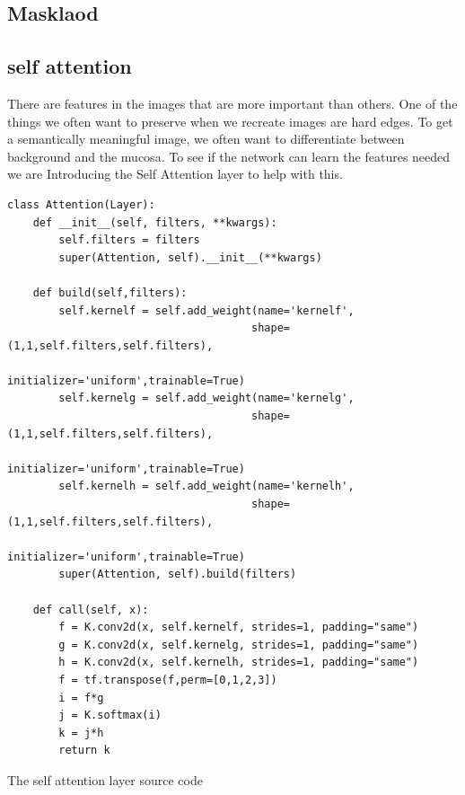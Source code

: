 \subsection{Masklaod}
\subsection{self attention}
There are features in the images that are more important than others. One of the things we often want to preserve when we recreate images are hard edges. To get a semantically meaningful image,  we often want to differentiate between background and the mucosa. 
To see if the network can learn the features needed we are Introducing the Self Attention layer to help with this. 


\begin{listing}[h]
\begin{verbatim}
class Attention(Layer): 
    def __init__(self, filters, **kwargs):
        self.filters = filters
        super(Attention, self).__init__(**kwargs)

    def build(self,filters):
        self.kernelf = self.add_weight(name='kernelf', 
                                      shape=(1,1,self.filters,self.filters),
                                      initializer='uniform',trainable=True)
        self.kernelg = self.add_weight(name='kernelg', 
                                      shape=(1,1,self.filters,self.filters),
                                      initializer='uniform',trainable=True)
        self.kernelh = self.add_weight(name='kernelh', 
                                      shape=(1,1,self.filters,self.filters),
                                      initializer='uniform',trainable=True)
        super(Attention, self).build(filters)

    def call(self, x):
        f = K.conv2d(x, self.kernelf, strides=1, padding="same")
        g = K.conv2d(x, self.kernelg, strides=1, padding="same")
        h = K.conv2d(x, self.kernelh, strides=1, padding="same")
        f = tf.transpose(f,perm=[0,1,2,3])
        i = f*g
        j = K.softmax(i)
        k = j*h
        return k

\end{verbatim}
\caption{The self attention layer source code}
\label{listing:Attention}
\end{listing}

